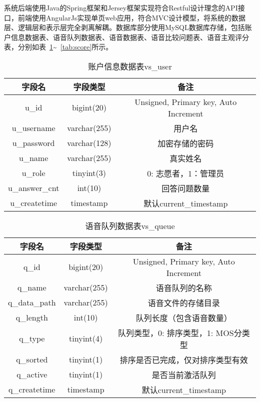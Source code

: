 系统后端使用Java的Spring框架和Jersey框架实现符合Restful设计理念的API接口，前端使用AngularJs实现单页web应用，符合MVC设计模型，将系统的数据层、逻辑层和表示层完全剥离解耦\cite{burbeck87}。数据库部分使用MySQL数据库存储，包括账户信息数据表、语音队列数据表、语音数据表、语音比较问题表、语音主观评分表，分别如表~\ref{tab:user}\~~\ref{tab:score}所示。

\begin{table}
\centering
\caption{账户信息数据表vs\_user}
\label{tab:user}
\begin{tabular}{ccc}
\toprule[1.5pt]
字段名 & 字段类型 & 备注 \\ \midrule[1pt]
u\_id & bigint(20) & Unsigned, Primary key, Auto Increment \\
u\_username & varchar(255) & 用户名 \\
u\_password & varchar(128) & 加密存储的密码 \\
u\_name & varchar(255) & 真实姓名 \\
u\_role & tinyint(3) & 0: 志愿者，1：管理员 \\
u\_answer\_cnt & int(10) & 回答问题数量 \\
u\_createtime & timestamp & 默认current\_timestamp \\ \bottomrule[1.5pt]
\end{tabular}
\end{table}

\begin{table}
\centering
\caption{语音队列数据表vs\_queue}
\label{tab:queue}
\begin{tabular}{ccc}
\toprule[1.5pt]
字段名 & 字段类型 & 备注 \\ \midrule[1pt]
q\_id & bigint(20) & Unsigned, Primary key, Auto Increment \\
q\_name & varchar(255) & 语音队列的名称 \\
q\_data\_path & varchar(255) & 语音文件的存储目录 \\
q\_length & int(10) & 队列长度（包含语音数量） \\
q\_type & tinyint(4) & 队列类型，0: 排序类型，1: MOS分类型 \\
q\_sorted & tinyint(1) & 排序是否已完成，仅对排序类型有效 \\
q\_active & tinyint(1) & 是否当前激活队列 \\
q\_createtime & timestamp & 默认current\_timestamp \\ \bottomrule[1.5pt]
\end{tabular}
\end{table}

